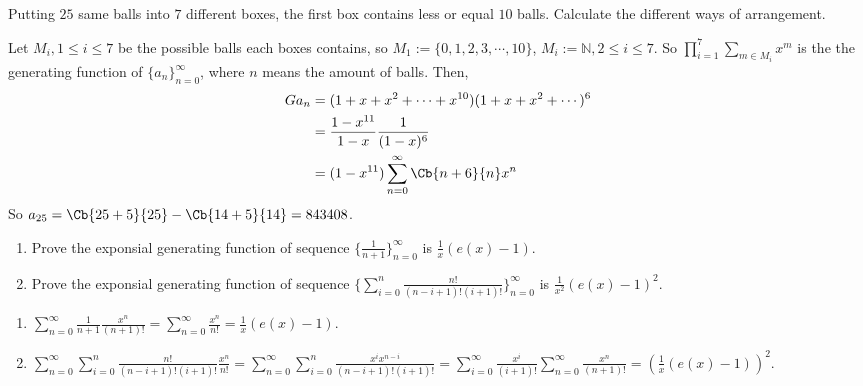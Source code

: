 \documentclass{ctexart}
\begin{document}
\begin{problem}
    Putting $25$ same balls into $7$ different boxes, the first box contains less or equal $10$ balls. Calculate the different ways of arrangement. 
\end{problem}
\begin{solution}
    Let $M_i, 1\leq i\leq 7$ be the possible balls each boxes contains, so $M_1:=\{0,1,2,3,\cdots,10\}$, $M_i:=\mathbb{N}, 2\leq i\leq 7$. So $\prod_{i=1}^7\sum_{m\in M_i}x^m$ is the the generating function of $\{a_n\}_{n=0}^{\infty}$, where $n$ means the amount of balls. Then,
    \begin{equation}
        \begin{aligned}
            G{a_n}&=(1+x+x^2+\cdots+x^{10})(1+x+x^2+\cdots)^6\\
                  &=\frac{1-x^{11}}{1-x}\frac{1}{(1-x)^6}\\
                  &=(1-x^{11})\sum_{n=0}^{\infty}\Cb{n+6}{n}x^n\\
        \end{aligned}
    \end{equation}
    So $a_{25}=\Cb{25+5}{25}-\Cb{14+5}{14}=843408$.
\end{solution}

\begin{problem}
    \begin{enumerate}
        \item Prove the exponsial generating function of sequence $\{\frac{1}{n+1}\}_{n=0}^{\infty}$ is $\frac{1}{x}(e(x)-1)$.
        \item Prove the exponsial generating function of sequence $\{\sum_{i=0}^n\frac{n!}{(n-i+1)!(i+1)!}\}_{n=0}^{\infty}$ is $\frac{1}{x^2}(e(x)-1)^2$.
    \end{enumerate}
\end{problem}
\begin{solution}
    \begin{enumerate}
        \item $\sum_{n=0}^{\infty}\frac{1}{n+1}\frac{x^n}{(n+1)!}=\sum_{n=0}^{\infty}\frac{x^n}{n!}=\frac{1}{x}(e(x)-1)$.
        \item $\sum_{n=0}^{\infty}\sum_{i=0}^n\frac{n!}{(n-i+1)!(i+1)!}\frac{x^n}{n!}=\sum_{n=0}^{\infty}\sum_{i=0}^n\frac{x^{i}x^{n-i}}{(n-i+1)!(i+1)!}=\sum_{i=0}^{\infty}\frac{x^{i}}{(i+1)!}\sum_{n=0}^{\infty}\frac{x^{n}}{(n+1)!}=(\frac{1}{x}(e(x)-1))^2.$
    \end{enumerate}
\end{solution}
\end{document}
